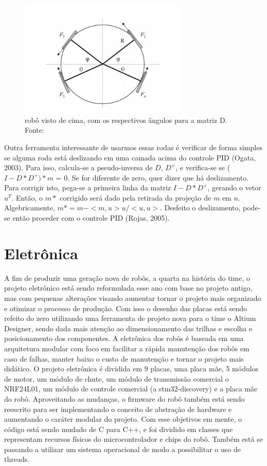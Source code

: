 \documentclass[letterpaper, 10 pt, conference]{ieeeconf}  %
\begin{document}
\begin{figure}[thpb]	
	\centering
	\includegraphics[width=8cm]{img/omni}
	\caption{robô visto de cima, com os respectivos ângulos para a matriz D. Fonte: \cite{omni}}
	\label{img:omni}
\end{figure}

Outra ferramenta interessante de usarmos essas rodas é verificar de forma simples se alguma roda está deslizando em uma camada acima do controle PID (Ogata, 2003)\cite{ogata-pid}. Para isso, calcula-se a pseudo-inversa de $D$, $D^+$, e verifica-se se ($I-D*D^+)*m$ = 0. Se for diferente de zero, quer dizer que há deslizamento. Para corrigir isto, pega-se a primeira linha da matriz $I-D*D^+$, gerando o vetor $u^T$. Então, o $m*$ corrigido será dado pela retirada da projeção de $m$ em $u$. Algebricamente, $m* = m - <m,u> u/<u,u>$. Desfeito o deslizamento, pode-se então proceder com o controle PID (Rojas, 2005)\cite{omni}.
 
\section{Eletrônica}
A fim de produzir uma geração nova de robôs, a quarta na história do time, o projeto eletrônico está sendo reformulada esse ano com base no projeto antigo, mas com pequenas alterações visando aumentar tornar o projeto mais organizado e otimizar o processo de produção. Com isso o desenho das placas está sendo refeito do zero utilizando uma ferramenta de projeto nova para o time o Altium Designer, sendo dada mais atenção ao dimensionamento das trilhas e escolha e posicionamento dos componentes.
A eletrônica dos robôs é baseada em uma arquitetura modular com foco em facilitar a rápida manutenção dos robôs em caso de falhas, manter baixo o custo de manutenção e tornar o projeto mais didático. O projeto eletrônica é dividida em 9 placas, uma placa mãe, 5 módulos de motor, um módulo de chute, um módulo de transmissão comercial o NRF24L01, um módulo de controle comercial (a stm32-discovery) e a placa mãe do robô.
Aproveitando as mudanças, o firmware do robô também está sendo reescrito para ser implementando o conceito de abstração de hardware e aumentando o caráter modular do projeto. Com esse objetivos em mente, o código está sendo mudado de C para C++, e foi dividido em classes que representam recursos físicos do microcontrolador e chips do robô. Também está se passando a utilizar um sistema operacional de modo a possibilitar o uso de threads.
\end{document}

